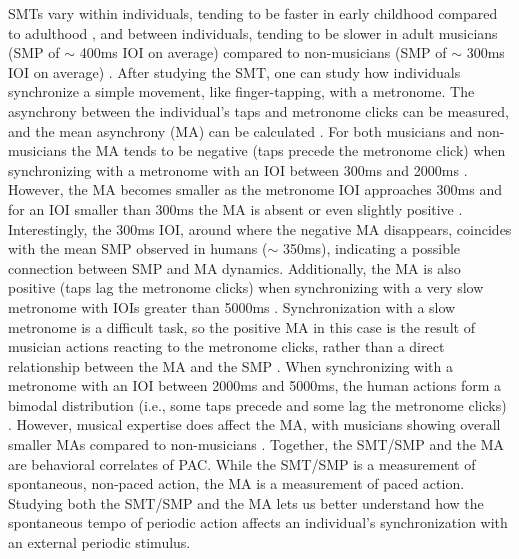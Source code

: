 \documentclass{report}
\begin{document}
SMTs vary within individuals, tending to be faster in early childhood compared to adulthood \cite{mcauley2006time}, and between individuals, tending to be slower in adult musicians (SMP of $\sim$ 400ms IOI on average) compared to non-musicians (SMP of $\sim$ 300ms IOI on average) \cite{scheurich2016spontaneous, drake2000tapping}. After studying the SMT, one can study how individuals synchronize a simple movement, like finger-tapping, with a metronome. The asynchrony between the individual's taps and metronome clicks can be measured, and the mean asynchrony (MA) can be calculated \cite{repp2005sensorimotor, repp2013sensorimotor}. For both musicians and non-musicians the MA tends to be negative (taps precede the metronome click) when synchronizing with a metronome with an IOI between 300ms and 2000ms \cite{mates1994temporal}. However, the MA becomes smaller as the metronome IOI approaches 300ms and for an IOI smaller than 300ms the MA is absent or even slightly positive \cite{repp2003rate, wohlschlager1999synchronization}. Interestingly, the 300ms IOI, around where the negative MA disappears, coincides with the mean SMP observed in humans ($\sim$ 350ms), indicating a possible connection between SMP and MA dynamics. Additionally, the MA is also positive (taps lag the metronome clicks) when synchronizing with a very slow metronome with IOIs greater than 5000ms \cite{miyake2004two}. Synchronization with a slow metronome is a difficult task, so the positive MA in this case is the result of musician actions reacting to the metronome clicks, rather than a direct relationship between the MA and the SMP \cite{repp2007tapping}. When synchronizing with a metronome with an IOI between 2000ms and 5000ms, the human actions form a bimodal distribution (i.e., some taps precede and some lag the metronome clicks) \cite{baaaath2016estimating}. However, musical expertise does affect the MA, with musicians showing overall smaller MAs compared to non-musicians \cite{repp2007tapping}. Together, the SMT/SMP and the MA are behavioral correlates of PAC. While the SMT/SMP is a measurement of spontaneous, non-paced action, the MA is a measurement of paced action. Studying both the SMT/SMP and the MA lets us better understand how the spontaneous tempo of periodic action affects an individual's synchronization with an external periodic stimulus.
\end{document}

